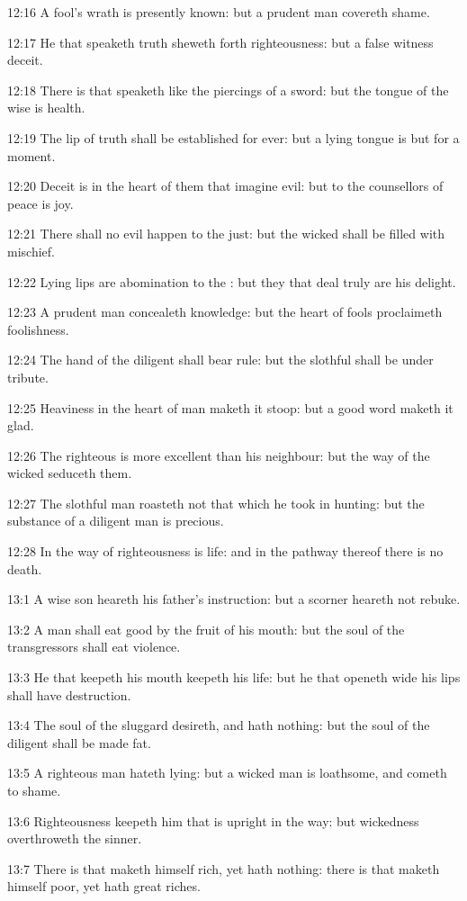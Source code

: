 12:16 A fool's wrath is presently known: but a prudent man covereth
shame.

12:17 He that speaketh truth sheweth forth righteousness: but a false
witness deceit.

12:18 There is that speaketh like the piercings of a sword: but the
tongue of the wise is health.

12:19 The lip of truth shall be established for ever: but a lying
tongue is but for a moment.

12:20 Deceit is in the heart of them that imagine evil: but to the
counsellors of peace is joy.

12:21 There shall no evil happen to the just: but the wicked shall be
filled with mischief.

12:22 Lying lips are abomination to the \LORD: but they that deal truly
are his delight.

12:23 A prudent man concealeth knowledge: but the heart of fools
proclaimeth foolishness.

12:24 The hand of the diligent shall bear rule: but the slothful shall
be under tribute.

12:25 Heaviness in the heart of man maketh it stoop: but a good word
maketh it glad.

12:26 The righteous is more excellent than his neighbour: but the way
of the wicked seduceth them.

12:27 The slothful man roasteth not that which he took in hunting: but
the substance of a diligent man is precious.

12:28 In the way of righteousness is life: and in the pathway thereof
there is no death.

13:1 A wise son heareth his father's instruction: but a scorner
heareth not rebuke.

13:2 A man shall eat good by the fruit of his mouth: but the soul of
the transgressors shall eat violence.

13:3 He that keepeth his mouth keepeth his life: but he that openeth
wide his lips shall have destruction.

13:4 The soul of the sluggard desireth, and hath nothing: but the soul
of the diligent shall be made fat.

13:5 A righteous man hateth lying: but a wicked man is loathsome, and
cometh to shame.

13:6 Righteousness keepeth him that is upright in the way: but
wickedness overthroweth the sinner.

13:7 There is that maketh himself rich, yet hath nothing: there is
that maketh himself poor, yet hath great riches.

